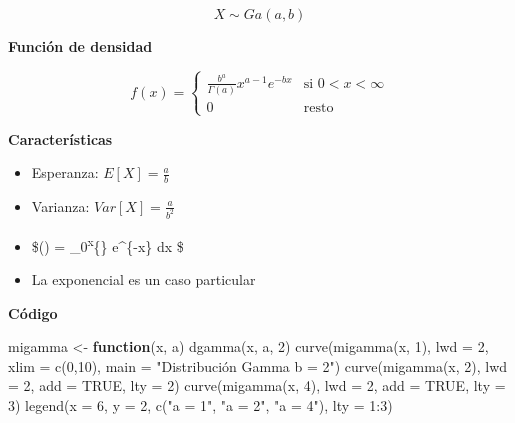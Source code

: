 \documentclass[
]{book}
\newenvironment{Shaded}{\begin{snugshade}}{\end{snugshade}}
\newcommand{\AttributeTok}[1]{\textcolor[rgb]{0.77,0.63,0.00}{#1}}
\newcommand{\ConstantTok}[1]{\textcolor[rgb]{0.00,0.00,0.00}{#1}}
\newcommand{\ControlFlowTok}[1]{\textcolor[rgb]{0.13,0.29,0.53}{\textbf{#1}}}
\newcommand{\DecValTok}[1]{\textcolor[rgb]{0.00,0.00,0.81}{#1}}
\newcommand{\FunctionTok}[1]{\textcolor[rgb]{0.00,0.00,0.00}{#1}}
\newcommand{\NormalTok}[1]{#1}
\newcommand{\OtherTok}[1]{\textcolor[rgb]{0.56,0.35,0.01}{#1}}
\newcommand{\SpecialCharTok}[1]{\textcolor[rgb]{0.00,0.00,0.00}{#1}}
\newcommand{\StringTok}[1]{\textcolor[rgb]{0.31,0.60,0.02}{#1}}
\providecommand{\tightlist}{%
  \setlength{\itemsep}{0pt}\setlength{\parskip}{0pt}}
\begin{document}
\[X \sim \mathit{Ga}(a, b)\]

\textbf{Función de densidad}

\[f(x) =
\begin{cases}
\frac{b^a}{\Gamma(a)}x^{a-1}{e}^{-bx} & \text{si } 0 < x < \infty\\
0 & \text{resto }
\end{cases}\]

\textbf{Características}

\begin{itemize}
\tightlist
\item
  Esperanza: \(E[X] = \frac{a}{b}\)
\item
  Varianza: \(\mathit{Var}[X] = \frac{a}{b^2}\)
\item
  \$\Gamma(\alpha) = \int\_0\textsuperscript{\infty x}\{\} e\^{}\{-x\} dx \$
\item
  La exponencial es un caso particular
\end{itemize}

\textbf{Código}

\begin{Shaded}
\begin{Highlighting}[]
\NormalTok{migamma }\OtherTok{\textless{}{-}} \ControlFlowTok{function}\NormalTok{(x, a) }\FunctionTok{dgamma}\NormalTok{(x, a, }\DecValTok{2}\NormalTok{)}
\FunctionTok{curve}\NormalTok{(}\FunctionTok{migamma}\NormalTok{(x, }\DecValTok{1}\NormalTok{), }\AttributeTok{lwd =} \DecValTok{2}\NormalTok{, }\AttributeTok{xlim =} \FunctionTok{c}\NormalTok{(}\DecValTok{0}\NormalTok{,}\DecValTok{10}\NormalTok{), }
      \AttributeTok{main =} \StringTok{"Distribución Gamma b = 2"}\NormalTok{)}
\FunctionTok{curve}\NormalTok{(}\FunctionTok{migamma}\NormalTok{(x, }\DecValTok{2}\NormalTok{), }\AttributeTok{lwd =} \DecValTok{2}\NormalTok{, }\AttributeTok{add =} \ConstantTok{TRUE}\NormalTok{, }\AttributeTok{lty =} \DecValTok{2}\NormalTok{)}
\FunctionTok{curve}\NormalTok{(}\FunctionTok{migamma}\NormalTok{(x, }\DecValTok{4}\NormalTok{), }\AttributeTok{lwd =} \DecValTok{2}\NormalTok{, }\AttributeTok{add =} \ConstantTok{TRUE}\NormalTok{, }\AttributeTok{lty =} \DecValTok{3}\NormalTok{)}
\FunctionTok{legend}\NormalTok{(}\AttributeTok{x =} \DecValTok{6}\NormalTok{, }\AttributeTok{y =} \DecValTok{2}\NormalTok{, }\FunctionTok{c}\NormalTok{(}\StringTok{"a = 1"}\NormalTok{, }\StringTok{"a = 2"}\NormalTok{, }\StringTok{"a = 4"}\NormalTok{), }\AttributeTok{lty =} \DecValTok{1}\SpecialCharTok{:}\DecValTok{3}\NormalTok{)}
\end{Highlighting}
\end{Shaded}
\end{document}
